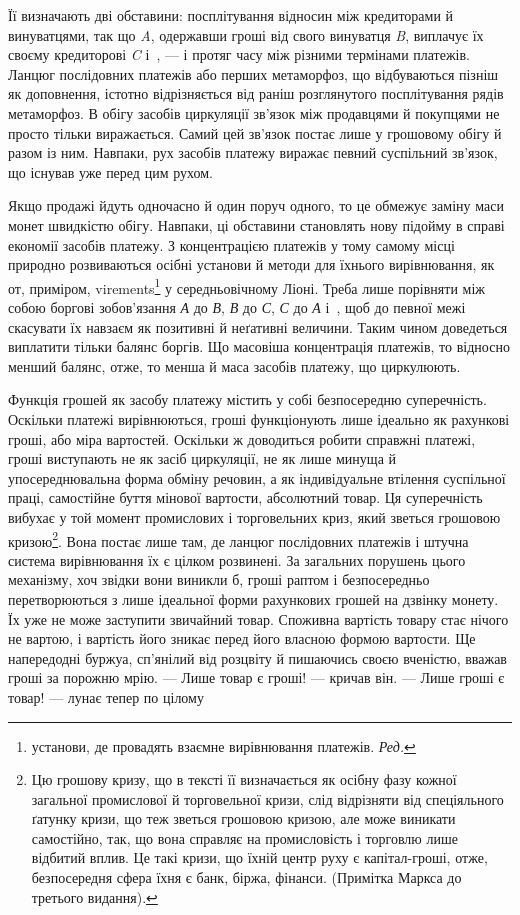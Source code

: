 \parcont{}  %
Її визначають дві обставини: посплітування відносин між кредиторами й винуватцями,
так що \emph{A}, одержавши гроші від свого винуватця \emph{B}, виплачує їх своєму
кредиторові \emph{C} і~, — і протяг часу між різними термінами платежів.
Ланцюг послідовних платежів або перших метаморфоз, що відбуваються
пізніш як доповнення, істотно відрізняється від раніш розглянутого посплітування
рядів метаморфоз. В обігу засобів циркуляції зв’язок між продавцями й покупцями
не просто тільки виражається. Самий цей зв’язок постає лише у грошовому обігу й
разом із ним. Навпаки, рух засобів платежу виражає певний
суспільний зв’язок, що існував уже перед цим рухом.

Якщо продажі йдуть одночасно й один поруч одного, то це обмежує заміну маси монет
швидкістю обігу. Навпаки, ці обставини становлять нову підойму в справі економії
засобів платежу. З концентрацією платежів у тому самому місці природно
розвиваються осібні установи й методи для їхнього
вирівнювання, як от, приміром, virements\footnote*{
установи, де провадять взаємне вирівнювання платежів. \emph{Ред.}
} у середньовічному Ліоні. Треба лише порівняти між собою
боргові зобов’язання \emph{А} до \emph{В}, \emph{В} до \emph{С}, \emph{С} до
\emph{А} і~, щоб до певної межі скасувати їх навзаєм як
позитивні й неґативні величини. Таким чином доведеться виплатити тільки балянс
боргів. Що масовіша концентрація платежів, то відносно менший балянс, отже, то
менша й маса засобів платежу, що циркулюють.

Функція грошей як засобу платежу містить у собі безпосередню суперечність.
Оскільки платежі вирівнюються, гроші функціонують лише ідеально як рахункові
гроші, або міра вартостей. Оскільки ж
доводиться робити справжні платежі, гроші
виступають не як засіб циркуляції, не як лише минуща й упосереднювальна форма
обміну речовин, а як індивідуальне втілення суспільної праці, самостійне буття
мінової вартости, абсолютний товар. Ця суперечність вибухає у той момент
промислових і торговельних криз, який зветься грошовою кризою\footnote{
Цю грошову кризу, що в тексті її визначається як осібну фазу кожної загальної
промислової й торговельної кризи, слід відрізняти від спеціяльного ґатунку
кризи, що теж зветься грошовою кризою, але може виникати самостійно, так, що
вона справляє на промисловість і торговлю лише відбитий вплив.
Це такі кризи, що їхній центр руху є капітал-гроші, отже, безпосередня сфера
їхня є банк, біржа, фінанси. (Примітка Маркса до третього видання).
}.
Вона постає лише там, де ланцюг послідовних платежів і штучна система
вирівнювання їх є цілком розвинені. За загальних порушень цього механізму,
хоч звідки вони виникли б, гроші раптом і безпосередньо перетворюються з лише
ідеальної форми рахункових грошей на дзвінку монету. Їх уже не може заступити
звичайний товар. Споживна вартість товару стає нічого не вартою, і вартість його
зникає перед його власною формою вартости. Ще напередодні буржуа, сп’янілий
від розцвіту й пишаючись своєю вченістю, вважав гроші за порожню мрію. — Лише
товар є гроші! — кричав він. — Лише гроші є товар! — лунає тепер по цілому
\parbreak{}  %
